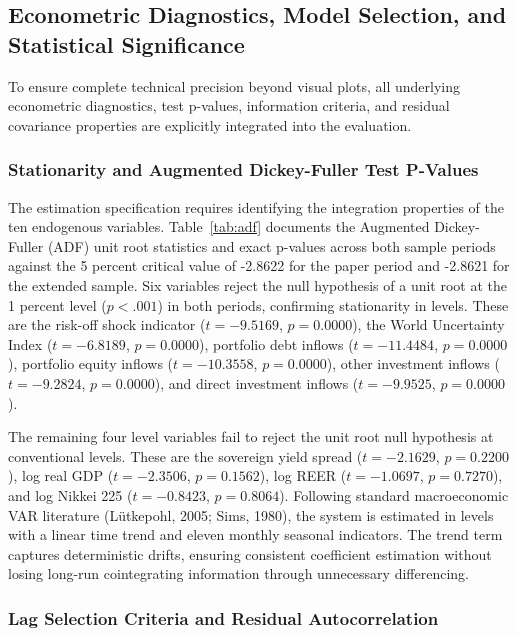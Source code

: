 \subsection{Econometric Diagnostics, Model Selection, and Statistical Significance}

To ensure complete technical precision beyond visual plots, all underlying econometric diagnostics, test p-values, information criteria, and residual covariance properties are explicitly integrated into the evaluation.

\subsubsection{Stationarity and Augmented Dickey-Fuller Test P-Values}

The estimation specification requires identifying the integration properties of the ten endogenous variables. Table~\ref{tab:adf} documents the Augmented Dickey-Fuller (ADF) unit root statistics and exact p-values across both sample periods against the 5 percent critical value of -2.8622 for the paper period and -2.8621 for the extended sample. Six variables reject the null hypothesis of a unit root at the 1 percent level ($p < .001$) in both periods, confirming stationarity in levels. These are the risk-off shock indicator ($t = -9.5169$, $p = 0.0000$), the World Uncertainty Index ($t = -6.8189$, $p = 0.0000$), portfolio debt inflows ($t = -11.4484$, $p = 0.0000$), portfolio equity inflows ($t = -10.3558$, $p = 0.0000$), other investment inflows ($t = -9.2824$, $p = 0.0000$), and direct investment inflows ($t = -9.9525$, $p = 0.0000$).

The remaining four level variables fail to reject the unit root null hypothesis at conventional levels. These are the sovereign yield spread ($t = -2.1629$, $p = 0.2200$), log real GDP ($t = -2.3506$, $p = 0.1562$), log REER ($t = -1.0697$, $p = 0.7270$), and log Nikkei 225 ($t = -0.8423$, $p = 0.8064$). Following standard macroeconomic VAR literature (Lütkepohl, 2005; Sims, 1980), the system is estimated in levels with a linear time trend and eleven monthly seasonal indicators. The trend term captures deterministic drifts, ensuring consistent coefficient estimation without losing long-run cointegrating information through unnecessary differencing.

\subsubsection{Lag Selection Criteria and Residual Autocorrelation}

